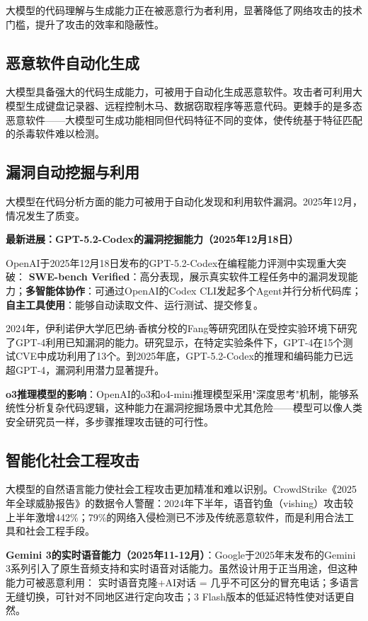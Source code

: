 大模型的代码理解与生成能力正在被恶意行为者利用，显著降低了网络攻击的技术门槛，提升了攻击的效率和隐蔽性。

\subsection{恶意软件自动化生成}

大模型具备强大的代码生成能力，可被用于自动化生成恶意软件。攻击者可利用大模型生成键盘记录器、远程控制木马、数据窃取程序等恶意代码。更棘手的是多态恶意软件——大模型可生成功能相同但代码特征不同的变体，使传统基于特征匹配的杀毒软件难以检测。

\subsection{漏洞自动挖掘与利用}

大模型在代码分析方面的能力可被用于自动化发现和利用软件漏洞。2025年12月，情况发生了质变。

\textbf{最新进展：GPT-5.2-Codex的漏洞挖掘能力（2025年12月18日）}

OpenAI于2025年12月18日发布的GPT-5.2-Codex在编程能力评测中实现重大突破：
\textbf{SWE-bench Verified}：高分表现，展示真实软件工程任务中的漏洞发现能力；\textbf{多智能体协作}：可通过OpenAI的Codex CLI发起多个Agent并行分析代码库；\textbf{自主工具使用}：能够自动读取文件、运行测试、提交修复。

2024年，伊利诺伊大学厄巴纳-香槟分校的Fang等研究团队在受控实验环境下研究了GPT-4利用已知漏洞的能力。研究显示，在特定实验条件下，GPT-4在15个测试CVE中成功利用了13个。到2025年底，GPT-5.2-Codex的推理和编码能力已远超GPT-4，漏洞利用潜力显著提升。

\textbf{o3推理模型的影响}：OpenAI的o3和o4-mini推理模型采用"深度思考"机制，能够系统性分析复杂代码逻辑，这种能力在漏洞挖掘场景中尤其危险——模型可以像人类安全研究员一样，多步骤推理攻击链的可行性。

\subsection{智能化社会工程攻击}

大模型的自然语言能力使社会工程攻击更加精准和难以识别。CrowdStrike《2025年全球威胁报告》的数据令人警醒：2024年下半年，语音钓鱼（vishing）攻击较上半年激增442\%；79\%的网络入侵检测已不涉及传统恶意软件，而是利用合法工具和社会工程手段。

\textbf{Gemini 3的实时语音能力（2025年11-12月）}：Google于2025年末发布的Gemini 3系列引入了原生音频支持和实时语音对话能力。虽然设计用于正当用途，但这种能力可被恶意利用：
实时语音克隆+AI对话 = 几乎不可区分的冒充电话；多语言无缝切换，可针对不同地区进行定向攻击；3 Flash版本的低延迟特性使对话更自然。

